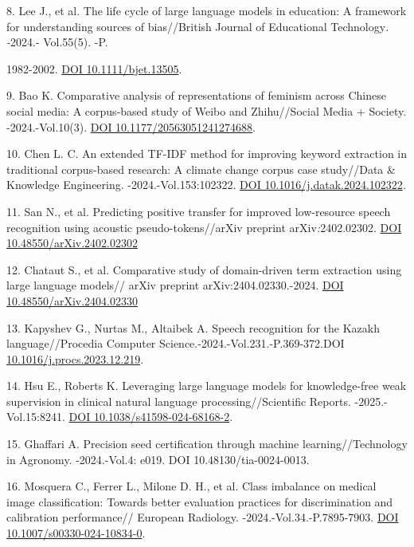 \begin{refs}
8. Lee J., et al. The life cycle of large language models in education:
A framework for understanding sources of bias//British Journal of
Educational Technology\emph{. -}2024.- Vol.55(5). -P.

1982-2002. \href{https://doi.org/10.1111/bjet.13505}{DOI
10.1111/bjet.13505}.

9. Bao K. Comparative analysis of representations of feminism across
Chinese social media: A corpus-based study of Weibo and Zhihu//Social
Media + Society. -2024.-Vol.10(3).
\href{https://doi.org/10.1177/20563051241274688}{DOI
10.1177/20563051241274688}.

10. Chen L. C. An extended TF-IDF method for improving keyword
extraction in traditional corpus-based research: A climate change corpus
case study//Data \& Knowledge Engineering. -2024.-Vol.153:102322.
\href{https://doi.org/10.1016/j.datak.2024.102322}{DOI
10.1016/j.datak.2024.102322}.

11. San N., et al. Predicting positive transfer for improved
low-resource speech recognition using acoustic pseudo-tokens//arXiv
preprint arXiv\emph{:}2402.02302.
\href{https://doi.org/10.48550/arXiv.2402.02302}{DOI
10.48550/arXiv.2402.02302}

12. Chataut S., et al. Comparative study of domain-driven term
extraction using large language models// arXiv preprint
arXiv:2404.02330.-2024.
\href{https://doi.org/10.48550/arXiv.2404.02330}{DOI
10.48550/arXiv.2404.02330}

13. Kapyshev G., Nurtas M., Altaibek A. Speech recognition for the
Kazakh language//Procedia Computer Science.-2024.-Vol.231.-P.369-372.DOI
\href{https://doi.org/10.1016/j.procs.2023.12.219}{10.1016/j.procs.2023.12.219}.

14. Hsu E., Roberts K. Leveraging large language models for
knowledge-free weak supervision in clinical natural language
processing//Scientific Reports. -2025.-Vol.15:8241.
\href{https://doi.org/10.1038/s41598-024-68168-2}{DOI
10.1038/s41598-024-68168-2}.

15. Ghaffari A. Precision seed certification through machine
learning//Technology in Agronomy. -2024.-Vol.4: e019. DOI
10.48130/tia-0024-0013.

16. Mosquera C., Ferrer L., Milone D. H., et al. Class imbalance on
medical image classification: Towards better evaluation practices for
discrimination and calibration performance// European Radiology.
-2024.-Vol.34.-P.7895-7903.
\href{https://doi.org/10.1007/s00330-024-10834-0}{DOI
10.1007/s00330-024-10834-0}.


\end{refs}
